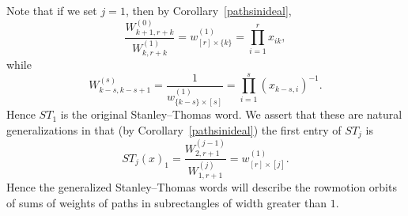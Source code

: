 \documentclass[ALCO,Unicode,published]{cedram}
\numberwithin{equation}{section}
\newcommand{\ST}{ST}
\begin{document}

Note that if we set $j=1$, then by Corollary~\ref{pathsinideal},
\[\frac{ W_{k+1,r+k}^{(0)} }{ W_{k,r+k}^{(1)} } = w^{(1)}_{[r]\times\{k\}} = \prod_{i=1}^r x_{ik},\]
while
\[W_{k-s,k-s+1}^{(s)} = \frac{1}{w_{\{k-s\}\times [s]}^{(1)}} = \prod_{i=1}^s (x_{k-s,i})^{-1}.\]
%
%
Hence $\ST_1$ is the original Stanley--Thomas word. We assert that these are natural generalizations in that (by Corollary~\ref{pathsinideal}) the first entry of $\ST_j$ is
\[\ST_j(x)_1 = \frac{ W_{2,r+1}^{(j-1)} }{ W_{1,r+1}^{(j)} } = w_{[r] \times [j]}^{(1)}.\]
Hence the generalized Stanley--Thomas words will describe the rowmotion orbits of sums of weights of paths in subrectangles of width greater than $1$.

\end{document}
